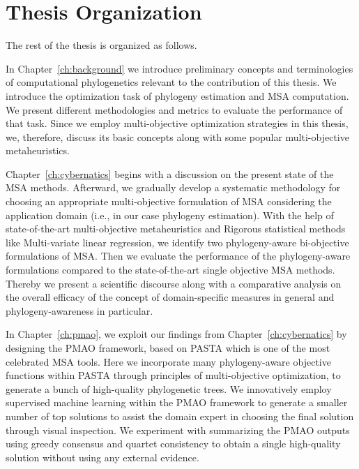 \section{Thesis Organization}

The rest of the thesis is organized as follows.

In Chapter~\ref{ch:background} we introduce preliminary concepts and terminologies of computational phylogenetics
relevant to the contribution of this thesis. We introduce the optimization task of phylogeny estimation and MSA computation. We present different methodologies and metrics to evaluate the performance of that task. Since we employ multi-objective optimization strategies in this thesis, we, therefore, discuss its basic concepts along with some popular multi-objective metaheuristics.

Chapter~\ref{ch:cybernatics} begins with a discussion on the present state of the MSA methods. Afterward, we gradually develop a systematic methodology for choosing an appropriate multi-objective formulation of MSA considering the application domain (i.e., in our case phylogeny estimation). With the help of state-of-the-art multi-objective metaheuristics and Rigorous statistical methods like Multi-variate linear regression, we identify two phylogeny-aware bi-objective formulations of MSA. Then we evaluate the performance of the phylogeny-aware formulations compared to the state-of-the-art single objective MSA methods. Thereby we present a scientific discourse along with a comparative analysis on the overall efficacy of the concept of domain-specific measures in general and phylogeny-awareness in particular.

In Chapter~\ref{ch:pmao}, we exploit our findings from Chapter~\ref{ch:cybernatics} by designing the PMAO framework, based on PASTA which is one of the most celebrated MSA tools. Here we incorporate many phylogeny-aware objective functions within PASTA through principles of multi-objective optimization, to generate a bunch of high-quality phylogenetic trees. We innovatively employ supervised machine learning within the PMAO framework to generate a smaller number of top solutions to assist the domain expert in choosing the final solution through visual inspection. We experiment with summarizing the PMAO outputs using greedy consensus and quartet consistency to obtain a single high-quality solution without using any external evidence.



